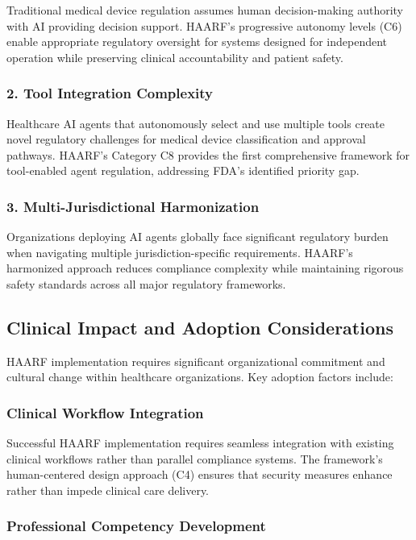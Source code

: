 \documentclass[11pt]{article}
\begin{document}
Traditional medical device regulation assumes human decision-making authority with AI providing decision support. HAARF's progressive autonomy levels (C6) enable appropriate regulatory oversight for systems designed for independent operation while preserving clinical accountability and patient safety.

\subsubsection{2. Tool Integration Complexity}

Healthcare AI agents that autonomously select and use multiple tools create novel regulatory challenges for medical device classification and approval pathways. HAARF's Category C8 provides the first comprehensive framework for tool-enabled agent regulation, addressing FDA's identified priority gap.

\subsubsection{3. Multi-Jurisdictional Harmonization}

Organizations deploying AI agents globally face significant regulatory burden when navigating multiple jurisdiction-specific requirements. HAARF's harmonized approach reduces compliance complexity while maintaining rigorous safety standards across all major regulatory frameworks.

\subsection{Clinical Impact and Adoption Considerations}

HAARF implementation requires significant organizational commitment and cultural change within healthcare organizations. Key adoption factors include:

\subsubsection{Clinical Workflow Integration}

Successful HAARF implementation requires seamless integration with existing clinical workflows rather than parallel compliance systems. The framework's human-centered design approach (C4) ensures that security measures enhance rather than impede clinical care delivery.

\subsubsection{Professional Competency Development}
\end{document}
